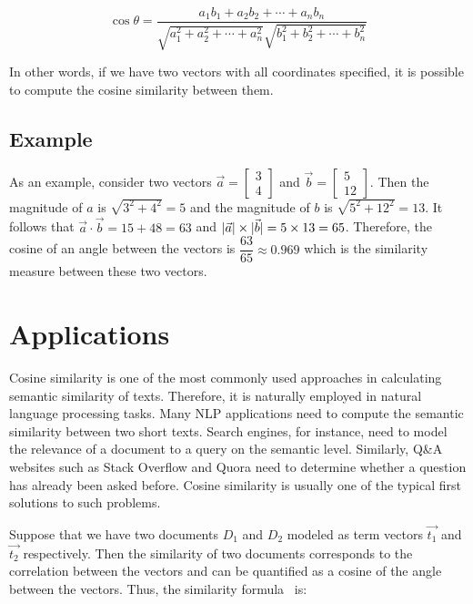 \documentclass[11pt]{article}
\DeclarePairedDelimiter\abs{\lvert}{\rvert}
\begin{document}
\[ \cos\theta = \dfrac{a_1b_1 + a_2b_2 + \cdots + a_nb_n}{\sqrt{a_1^2 + a_2^2 + \cdots + a_n^2}\sqrt{b_1^2 + b_2^2 + \cdots + b_n^2}} \]

In other words, if we have two vectors with all coordinates specified, it is
possible to compute the cosine similarity between them.

\subsection{Example}

As an example, consider two vectors
\(\vec{a} = \begin{bmatrix}3 \\ 4\end{bmatrix}\)
and \(\vec{b} = \begin{bmatrix}5 \\ 12\end{bmatrix}\).
Then the magnitude of \(a\) is \(\sqrt{3^2 + 4^2} = 5\) and the magnitude of
\(b\) is \(\sqrt{5^2 + 12^2} = 13\). It follows that
\(\vec{a} \cdot \vec{b} = 15 + 48 = 63\) and
\(\abs{\vec{a}} \times \abs{\vec{b}} = 5 \times 13 = 65\). Therefore, the
cosine of an angle between the vectors is \(\dfrac{63}{65} \approx 0.969\)
which is the similarity measure between these two vectors.


\section{Applications}

Cosine similarity is one of the most commonly used approaches in calculating
semantic similarity of texts. Therefore, it is naturally employed in natural
language processing tasks. Many NLP applications need to compute the semantic
similarity between two short texts. Search engines, for instance, need to model
the relevance of a document to a query on the semantic level.  Similarly, Q\&A
websites such as Stack Overflow and Quora need to determine whether a question
has already been asked before. Cosine similarity is usually one of the typical
first solutions to such problems.

\bigskip

Suppose that we have two documents \(D_1\) and \(D_2\) modeled as term vectors
\(\vec{t_1}\) and \(\vec{t_2}\) respectively. Then the similarity of two
documents corresponds to the correlation between the vectors and can be
quantified as a cosine of the angle between the vectors. Thus, the similarity
formula~\cite{huang2008} is:
\end{document}
